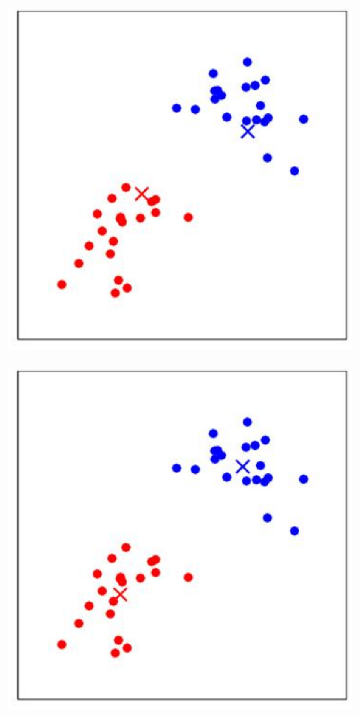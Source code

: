 \documentclass{article}
\begin{document}
\begin{figure}
\begin{subfigure}[b]{0.3\textwidth}
    \caption{}
    \label{}
  \end{subfigure}
  \hfill
  \begin{subfigure}[b]{0.3\textwidth}
    \centering
    \includegraphics[width=\textwidth]{kmeans/kmeans5.eps}
    \caption{}
    \label{}
  \end{subfigure}
  \hfill
  \begin{subfigure}[b]{0.3\textwidth}
    \centering
    \includegraphics[width=\textwidth]{kmeans/kmeans6.eps}

\end{subfigure}
\end{figure}
\end{document}
